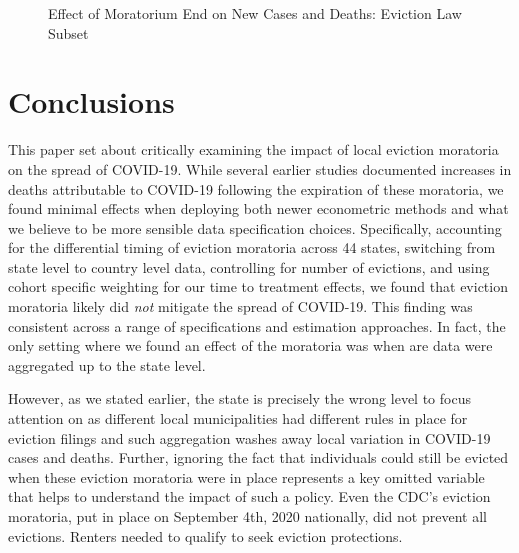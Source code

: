 \documentclass[12pt]{amsart}
\begin{document}
\begin{figure}[H]
    \caption{Effect of Moratorium End on New Cases and Deaths: Eviction Law Subset}
    \centering     %
{\footnotesize \justifying {} \par}
\end{figure}

\section{Conclusions}

This paper set about critically examining the impact of local eviction moratoria on the spread of COVID-19. While several earlier studies documented increases in deaths attributable to COVID-19 following the expiration of these moratoria, we found minimal effects when deploying both newer econometric methods and what we believe to be more sensible data specification choices. Specifically, accounting for the differential timing of eviction moratoria across 44 states, switching from state level to country level data, controlling for number of evictions, and using cohort specific weighting for our time to treatment effects, we found that eviction moratoria likely did \textit{not} mitigate the spread of COVID-19. This finding was consistent across a range of specifications and estimation approaches. In fact, the only setting where we found an effect of the moratoria was when are data were aggregated up to the state level. 

However, as we stated earlier, the state is precisely the wrong level to focus attention on as different local municipalities had different rules in place for eviction filings and such aggregation washes away local variation in COVID-19 cases and deaths. Further, ignoring the fact that individuals could still be evicted when these eviction moratoria were in place represents a key omitted variable that helps to understand the impact of such a policy. Even the CDC's eviction moratoria, put in place on September 4th, 2020 nationally, did not prevent all evictions. Renters needed to qualify to seek eviction protections. 
\end{document}

